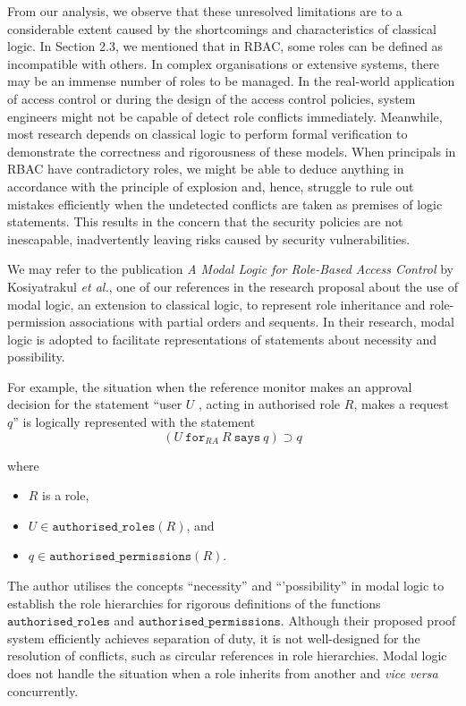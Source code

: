 \documentclass{article}
\begin{document}
From our analysis, we observe that these unresolved limitations are to a
considerable extent caused by the shortcomings and characteristics of classical
logic. In Section 2.3, we mentioned that in RBAC, some roles can be defined
as incompatible with others. In complex organisations or extensive systems,
there may be an immense number of roles to be managed. In the real-world
application of access control or during the design of the access control
policies, system engineers might not be capable of detect role conflicts
immediately. Meanwhile, most research depends on classical logic to perform
formal verification to demonstrate the correctness and rigorousness of these
models. When principals in RBAC have contradictory roles, we might be able
to deduce anything in accordance with the principle of explosion and, hence,
struggle to rule out mistakes efficiently when the undetected conflicts are
taken as premises of logic statements. This results in the concern that the
security policies are not inescapable, inadvertently leaving risks caused
by security vulnerabilities.\cite{rbac-vs-abac}

We may refer to the publication \textit{A Modal Logic for Role-Based Access
Control} by Kosiyatrakul \textit{et al.}, one of our references in the
research proposal about the use of modal logic, an extension to classical
logic, to represent role inheritance and role-permission associations
with partial orders and sequents. In their research, modal logic is
adopted to facilitate representations of statements about necessity and
possibility.\cite{modal-logic}

For example, the situation when the reference monitor makes an approval
decision for the statement ``user $U$ , acting in authorised role $R$,
makes a request $q$'' is logically represented with the statement $$(U\
\texttt{for}_{RA}\ R\ \texttt{says}\ q) \supset q$$

where \begin{itemize}
    \item $R$ is a role, \item $U \in \texttt{authorised\_roles}(R)$, and
    \item $q \in \texttt{authorised\_permissions}(R)$.
\end{itemize}

The author utilises the concepts ``necessity'' and ``'possibility''
in modal logic to establish the role hierarchies for rigorous
definitions of the functions $\texttt{authorised\_roles}$ and
$\texttt{authorised\_permissions}$. Although their proposed proof system
efficiently achieves separation of duty, it is not well-designed for the
resolution of conflicts, such as circular references in role hierarchies. Modal
logic does not handle the situation when a role inherits from another and
\textit{vice versa} concurrently.
\end{document}
